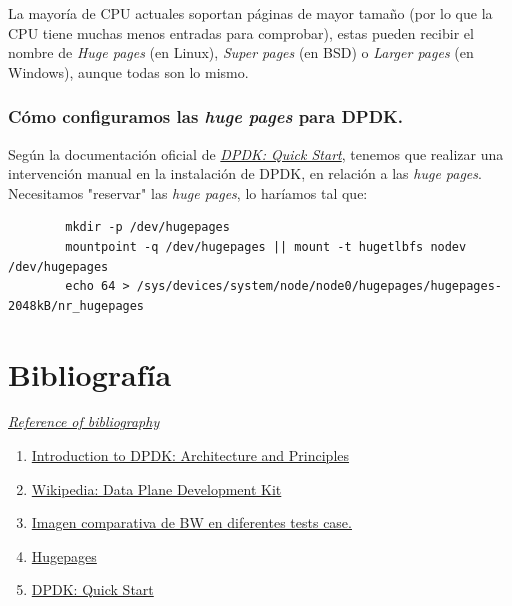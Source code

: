 \documentclass[12pt]{article}
\begin{document}
    \noindent La mayoría de CPU actuales soportan páginas de mayor tamaño (por lo que la CPU tiene muchas menos entradas para comprobar), estas pueden recibir el nombre de \emph{Huge pages} (en Linux), \emph{Super pages} (en BSD) o \emph{Larger pages} (en Windows), aunque todas son lo mismo.\\
    
    \subsubsection{Cómo configuramos las \emph{huge pages} para DPDK.}
    \noindent Según la documentación oficial de \hyperref[bib:link4]{\emph{DPDK: Quick Start}}, tenemos que realizar una intervención manual en la instalación de DPDK, en relación a las \emph{huge pages}. Necesitamos "reservar" las \emph{huge pages}, lo haríamos tal que: 
    
    \begin{verbatim}
    	mkdir -p /dev/hugepages
    	mountpoint -q /dev/hugepages || mount -t hugetlbfs nodev /dev/hugepages
    	echo 64 > /sys/devices/system/node/node0/hugepages/hugepages-2048kB/nr_hugepages
    \end{verbatim}
    
    
    
    
    
    
    \pagebreak
    \section{Bibliografía}
    \hyperref[bib:link1]{\emph{Reference of bibliography}}
    \begin{enumerate}
        \item \label{bib:link1} \href{https://blog.selectel.com/introduction-dpdk-architecture-principles/}{Introduction to DPDK: Architecture and Principles}
        
        \item \label{bib:link2}\href{https://en.wikipedia.org/wiki/Data_Plane_Development_Kit}{Wikipedia: Data Plane Development Kit}
        
        \item \label{bib:img1}\href{https://www.accton.com/Technology-Brief/intel-dpdk-performance-on-the-sau5081i-server/}{Imagen comparativa de BW en diferentes tests case.}
        
        \item \label{bib:link3}\href{https://wiki.debian.org/Hugepages}{Hugepages}
        
        \item
        \label{bib:link4}\href{https://core.dpdk.org/doc/quick-start/}{DPDK: Quick Start}
    \end{enumerate}
\end{document}
